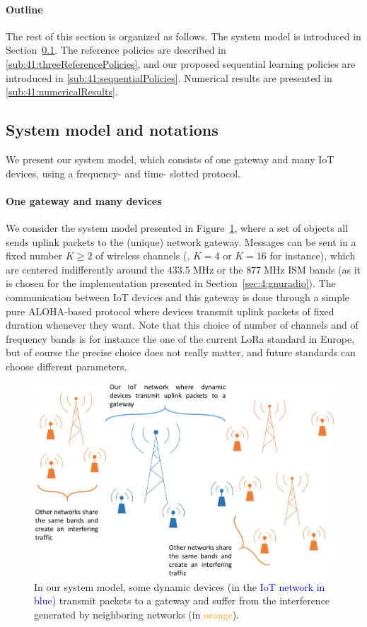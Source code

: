 \paragraph{Outline}
%
The rest of this section is organized as follows. The system model is introduced in Section~\ref{sub:41:systemModel}. The reference policies are described in \ref{sub:41:threeReferencePolicies}, and our proposed sequential learning policies are introduced in \ref{sub:41:sequentialPolicies}.
Numerical results are presented in \ref{sub:41:numericalResults}.


\subsection{System model and notations}\label{sub:41:systemModel}

We present our system model, which consists of one gateway and many IoT devices, using a frequency- and time- slotted protocol.

\paragraph{One gateway and many devices}
%
We consider the system model presented in Figure~\ref{fig:41:system_model1}, where a set of objects all sends uplink packets to the (unique) network gateway.
Messages can be sent in a fixed number $K\geq2$ of wireless channels (\eg, $K=4$ or $K=16$ for instance), which are centered indifferently around the $433.5\;\mathrm{MHz}$ or the $877\;\mathrm{MHz}$ ISM bands (as it is chosen for the implementation presented in Section~\ref{sec:4:gnuradio}).
The communication between IoT devices and this gateway is done through a simple pure ALOHA-based protocol where devices transmit uplink packets of fixed duration whenever they want.
%
Note that this choice of number of channels and of frequency bands is for instance the one of the current LoRa standard in Europe, but of course the precise choice does not really matter, and future standards can choose different parameters.

\begin{figure}[!b]
    \centering
    \includegraphics[width=0.70\linewidth]{system_model1.eps}
    \caption{In our system model, some dynamic devices (in the \textcolor{blue}{IoT network in blue}) transmit packets to a gateway and suffer from the interference generated by neighboring networks (in \textcolor{orange}{orange}).}
    \label{fig:41:system_model1}
\end{figure}

